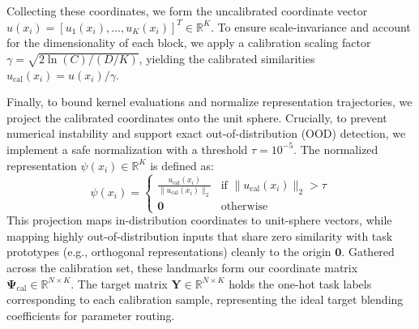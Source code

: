 Collecting these coordinates, we form the uncalibrated coordinate vector $u(x_i) = [u_1(x_i), \dots, u_K(x_i)]^T \in \mathbb{R}^K$. To ensure scale-invariance and account for the dimensionality of each block, we apply a calibration scaling factor $\gamma = \sqrt{2 \ln(C) / (D/K)}$, yielding the calibrated similarities $u_{\text{cal}}(x_i) = u(x_i) / \gamma$.

Finally, to bound kernel evaluations and normalize representation trajectories, we project the calibrated coordinates onto the unit sphere. Crucially, to prevent numerical instability and support exact out-of-distribution (OOD) detection, we implement a safe normalization with a threshold $\tau = 10^{-5}$. The normalized representation $\psi(x_i) \in \mathbb{R}^K$ is defined as:
\begin{equation}
\psi(x_i) = \begin{cases} \frac{u_{\text{cal}}(x_i)}{\|u_{\text{cal}}(x_i)\|_2} & \text{if } \|u_{\text{cal}}(x_i)\|_2 > \tau \\ \mathbf{0} & \text{otherwise} \end{cases}
\label{eq:projection}
\end{equation}
This projection maps in-distribution coordinates to unit-sphere vectors, while mapping highly out-of-distribution inputs that share zero similarity with task prototypes (e.g., orthogonal representations) cleanly to the origin $\mathbf{0}$. Gathered across the calibration set, these landmarks form our coordinate matrix $\mathbf{\Psi}_{\text{cal}} \in \mathbb{R}^{N \times K}$. The target matrix $\mathbf{Y} \in \mathbb{R}^{N \times K}$ holds the one-hot task labels corresponding to each calibration sample, representing the ideal target blending coefficients for parameter routing.

